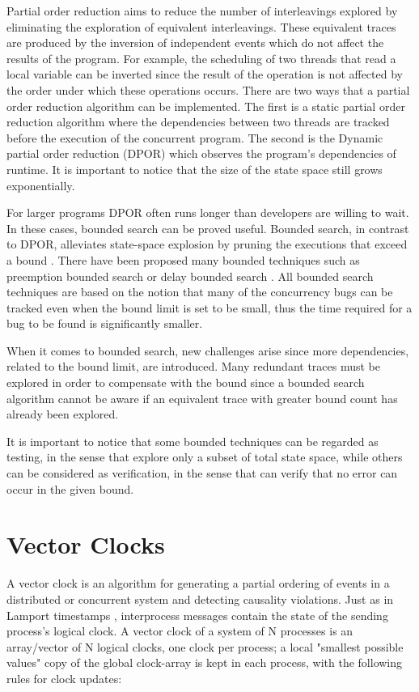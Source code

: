 Partial order reduction aims to reduce the number of interleavings explored by eliminating the 
exploration of equivalent interleavings.
These equivalent traces are produced by the inversion of independent events which do not affect the results of the program. For example, the scheduling of two threads that read a local
variable can be inverted since the result of the operation is not affected by the order under which these operations occurs. 
There are two ways that a partial order reduction algorithm can be implemented. The first is a
static partial order reduction algorithm \cite{Static1997} where the dependencies between two threads are tracked before the execution of the concurrent program. 
The second is the Dynamic partial order reduction (DPOR) which observes the program's dependencies of runtime. It is important to notice that the size of
the state space still grows exponentially. 

For larger programs DPOR often runs longer than developers are willing to wait. In these cases, bounded search can be proved useful. Bounded search,
in contrast to DPOR, alleviates state-space explosion by pruning the executions that exceed a bound \cite{Thomson}. There have been proposed many bounded techniques
such as preemption bounded search \cite{BPOR} or delay bounded search \cite{Delay11}. All bounded search techniques are based on the notion that many of the concurrency bugs can be
tracked even when the bound limit is set to be small, thus the time required for a bug to be found is significantly smaller.

When it comes to bounded search, new challenges arise \cite{BPOR} since more dependencies, related to the bound limit, are introduced. 
Many redundant traces must be explored in order to compensate with the bound since a bounded search algorithm cannot be aware if an equivalent trace with greater bound count
has already been explored.

It is important to notice that some bounded techniques can be regarded as testing, in the sense that explore only a subset of total state space, while
others can be considered as verification, in the sense that can verify that no error can occur in the given bound.

\section{Vector Clocks}

A vector clock is an algorithm for generating a partial ordering of events in a distributed or concurrent system and detecting causality violations. 
Just as in Lamport timestamps \cite{Lamp}, interprocess messages contain the state of the sending process's logical clock. 
A vector clock of a system of N processes is an array/vector of N logical clocks, one clock per process; 
a local "smallest possible values" copy of the global clock-array is kept in each process, with the following rules for clock updates:

